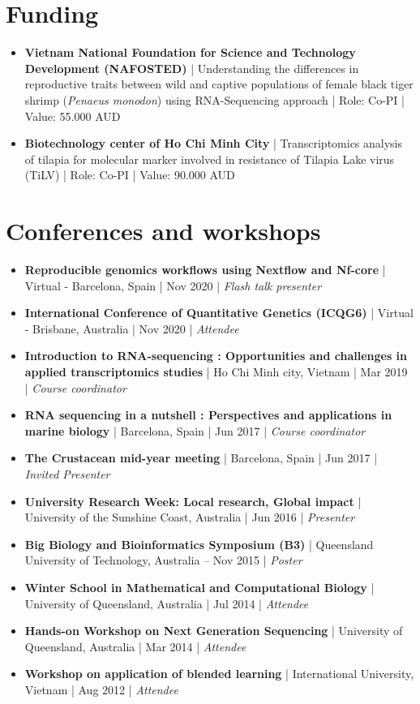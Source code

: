 \documentclass[letterpaper,11pt]{article}
\newcommand{\resumeBlack}[1]{\item\small{{#1}}}
\newcommand{\resumeItemListStart}{\begin{itemize}}
\newcommand{\resumeItemListEnd}{\end{itemize}}
\begin{document}
\section{Funding}
  \resumeItemListStart
    \resumeBlack{\textbf{Vietnam National Foundation for Science and Technology Development (NAFOSTED)} | Understanding the differences in reproductive traits between wild and captive populations of female black tiger shrimp (\textit{Penaeus monodon}) using RNA-Sequencing approach | Role: Co-PI | Value: 55.000 AUD}
    \resumeBlack{\textbf{Biotechnology center of Ho Chi Minh City } | Transcriptomics analysis of tilapia for molecular marker involved in resistance of Tilapia Lake virus (TiLV) | Role: Co-PI | Value: 90.000 AUD}
  \resumeItemListEnd
  
\section{Conferences and workshops}
  \resumeItemListStart
    \resumeBlack{\textbf{Reproducible genomics workflows using Nextflow and Nf-core}  | Virtual - Barcelona, Spain | Nov 2020 | \textit{Flash talk presenter}}
    \resumeBlack{\textbf{International Conference of Quantitative Genetics (ICQG6)}  |  Virtual - Brisbane, Australia | Nov 2020 | \textit{Attendee}}
    \resumeBlack{\textbf{Introduction to RNA-sequencing : Opportunities and challenges in applied transcriptomics studies}  |  Ho Chi Minh city, Vietnam | Mar 2019 | \textit{Course coordinator}}
    \resumeBlack{\textbf{RNA sequencing in a nutshell : Perspectives and applications in marine biology}  |  Barcelona, Spain | Jun 2017 | \textit{Course coordinator}}
    \resumeBlack{\textbf{The Crustacean mid-year meeting} | Barcelona, Spain | Jun 2017 | \textit{Invited Presenter}}
    \resumeBlack{\textbf{University Research Week: Local research, Global impact} | University of the Sunshine Coast, Australia | Jun 2016 | \textit{Presenter}}
    \resumeBlack{\textbf{Big Biology and Bioinformatics Symposium (B3)} | Queensland University of Technology, Australia – Nov 2015 | \textit{Poster}}
    \resumeBlack{\textbf{Winter School in Mathematical and Computational Biology} | University of Queensland, Australia | Jul 2014 | \textit{Attendee}}
    \resumeBlack{\textbf{Hands-on Workshop on Next Generation Sequencing} | University of Queensland, Australia | Mar 2014 | \textit{Attendee}}
    \resumeBlack{\textbf{Workshop on application of blended learning} | International University, Vietnam | Aug 2012 | \textit{Attendee}}
  \resumeItemListEnd
\end{document}
